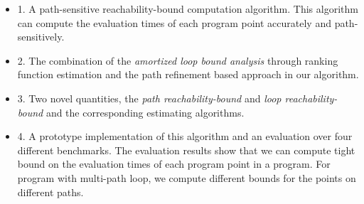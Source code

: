 \begin{itemize}
  \item 
1. A path-sensitive reachability-bound computation algorithm.
This algorithm can compute the evaluation times of each program point accurately and path-sensitively.
 \item 
2. The combination of the \emph{amortized loop bound analysis} through ranking function estimation and the path refinement based approach in our algorithm.
\item 
3. Two novel quantities, the \emph{path reachability-bound} and \emph{loop reachability-bound} and the corresponding estimating algorithms.
\item 
4. A prototype implementation of this algorithm and an evaluation over four different benchmarks.
  The evaluation results show that we can compute tight bound on the evaluation times of each program point in a program. For program with multi-path loop, we compute different bounds for the points on different paths.
\end{itemize}